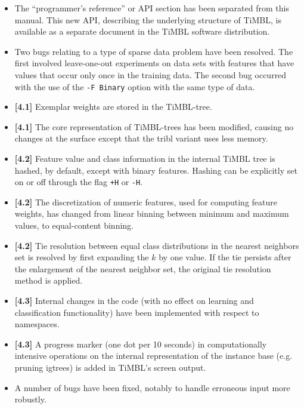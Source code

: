 \documentclass{report}
\begin{document}
\begin{itemize}
\item The ``programmer's reference'' or API section has been separated
  from this manual. This new API, describing the underlying structure
  of TiMBL, is available as a separate document in the TiMBL software
  distribution.

\item Two bugs relating to a type of sparse data problem have been
resolved. The first involved leave-one-out experiments on data sets
with features that have values that occur only once in the training
data. The second bug occurred with the use of the {\tt -F Binary}
option with the same type of data.

\item {\bf [4.1]} Exemplar weights are stored in the TiMBL-tree.

\item {\bf [4.1]} The core representation of
TiMBL-trees has been modified, causing no changes at the surface
except that the {\sc tribl} variant uses less memory.

\item {\bf [4.2]} Feature value and class information in the internal
TiMBL tree is hashed, by default, except with binary features. Hashing
can be explicitly set on or off through the flag {\tt +H} or {\tt -H}.

\item {\bf [4.2]} The discretization of numeric
features, used for computing feature weights, has changed from linear
binning between minimum and maximum values, to equal-content binning.

\item {\bf [4.2]} Tie resolution between equal
class distributions in the nearest neighbors set is resolved by first
expanding the $k$ by one value. If the tie persists after the
enlargement of the nearest neighbor set, the original tie resolution
method is applied.

\item {\bf [4.3]} Internal changes in the code (with no effect on
learning and classification functionality) have been implemented with
respect to namespaces.

\item {\bf [4.3]} A progress marker (one dot per 10 seconds) in
computationally intensive operations on the internal representation of
the instance base (e.g. pruning {\sc igtree}s) is added in TiMBL's
screen output.

\item A number of bugs have been fixed, notably to handle erroneous
input more robustly.

\end{itemize}
\end{document}
